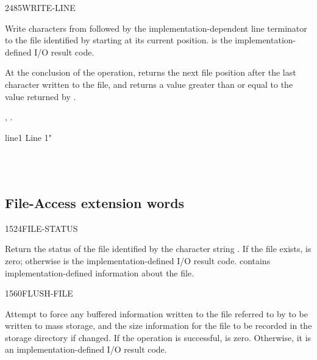 \vspace*{-3ex}
\begin{worddef}{2485}{WRITE-LINE}
\item {}

	Write  characters from  followed by the
	implementation-dependent line terminator to the file identified
	by  starting at its current position.  is
	the implementation-defined I/O result code.

	At the conclusion of the operation,  returns
	the next file position after the last character written to the
	file, and  returns a value greater than or equal
	to the value returned by .

\see {},
	.

	\begin{testing} %
		\ttfamily
		\word{:} line1  Line 1" \word{;}

		 \\
		 \\
	\end{testing}
\end{worddef}


\subsection{File-Access extension words} %
\extended

\begin{worddef}{1524}{FILE-STATUS}
\item {}

	Return the status of the file identified by the character string
	. If the file exists,  is zero;
	otherwise  is the implementation-defined I/O result
	code.  contains implementation-defined information about
	the file.
\end{worddef}


\vspace*{-3ex}
\begin{worddef}{1560}{FLUSH-FILE}
\item {}

	Attempt to force any buffered information written to the file
	referred to by  to be written to mass storage, and
	the size information for the file to be recorded in the storage
	directory if changed. If the operation is successful, 
	is zero. Otherwise, it is an implementation-defined I/O result
	code.
\end{worddef}

